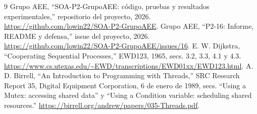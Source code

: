 \documentclass[conference]{IEEEtran}
\begin{document}
\begin{thebibliography}{9}
 Grupo AEE, ``SOA-P2-GrupoAEE: código, pruebas y resultados experimentales,'' repositorio del proyecto, 2026. \url{https://github.com/lowin22/SOA-P2-GrupoAEE}.
 Grupo AEE, ``P2-16: Informe, README y defensa,'' issue del proyecto, 2026. \url{https://github.com/lowin22/SOA-P2-GrupoAEE/issues/16}.
 E. W. Dijkstra, ``Cooperating Sequential Processes,'' EWD123, 1965, secs. 3.2, 3.3, 4.1 y 4.3. \url{https://www.cs.utexas.edu/~EWD/transcriptions/EWD01xx/EWD123.html}.
 A. D. Birrell, ``An Introduction to Programming with Threads,'' SRC Research Report 35, Digital Equipment Corporation, 6 de enero de 1989, secs. ``Using a Mutex: accessing shared data'' y ``Using a Condition variable: scheduling shared resources.'' \url{https://birrell.org/andrew/papers/035-Threads.pdf}.

\end{thebibliography}
\end{document}
